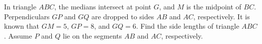 In triangle $ABC$, the medians intersect at point $G$, and $M$ is the midpoint of $BC$. Perpendiculars $GP$ and $GQ$ are dropped to sides $AB$ and $AC$, respectively. It is known that $GM=5$, $GP=8$, and $GQ=6$. Find the side lengths of triangle $ABC$. Assume $P$ and $Q$ lie on the segments $AB$ and $AC$, respectively.
